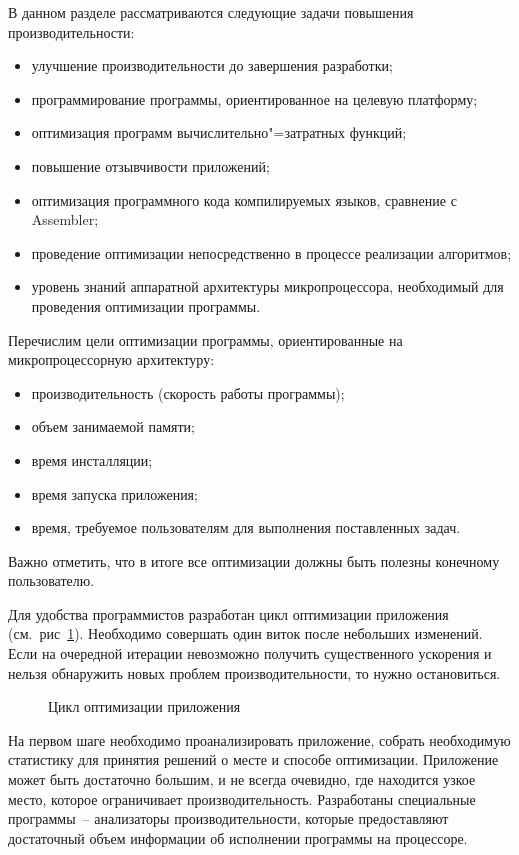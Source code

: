 \documentclass[14pt, a4paper, openany, twoside, draft]{extbook} %
\begin{document}
В данном разделе рассматриваются следующие задачи повышения производительности:
\begin{itemize}
\item улучшение производительности до завершения разработки;
\item программирование программы, ориентированное на целевую платформу;
\item оптимизация программ вычислительно"=затратных функций;
\item повышение отзывчивости приложений;
\item оптимизация программного кода компилируемых языков, сравнение с Assembler;
\item проведение оптимизации непосредственно в процессе реализации алгоритмов;
\item уровень знаний аппаратной архитектуры микропроцессора, необходимый для проведения оптимизации программы.
\end{itemize}

Перечислим цели оптимизации программы, ориентированные на микропроцессорную архитектуру:
\begin{itemize}
\item производительность (скорость работы программы);
\item объем занимаемой памяти;
\item время инсталляции;
\item время запуска приложения;
\item время, требуемое пользователям для выполнения поставленных задач.
\end{itemize}
Важно отметить, что в итоге все оптимизации должны быть полезны конечному пользователю.

Для удобства программистов разработан цикл оптимизации приложения (см.~рис~\ref{fig:opt-cycle}). Необходимо совершать один виток после небольших изменений. Если на очередной итерации невозможно получить существенного ускорения и нельзя обнаружить новых проблем производительности, то нужно остановиться.

\begin{figure}[hbt]
  \centering

  \caption{Цикл оптимизации приложения}
  \label{fig:opt-cycle}
\end{figure}

На первом шаге необходимо проанализировать приложение, собрать необходимую статистику для принятия решений о месте и способе оптимизации. Приложение может быть достаточно большим, и не всегда очевидно, где находится узкое место, которое ограничивает производительность. Разработаны специальные программы~-- анализаторы производительности, которые предоставляют достаточный объем информации об исполнении программы на процессоре.
\end{document}
